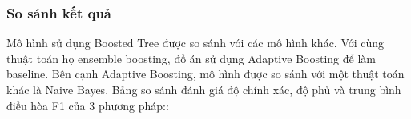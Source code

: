 \subsubsection*{So sánh kết quả}
Mô hình sử dụng Boosted Tree được so sánh với các mô hình khác. Với cùng thuật toán họ ensemble boosting, đồ án sử dụng Adaptive Boosting \cite{ada} để làm baseline. Bên cạnh Adaptive Boosting, mô hình được so sánh với một thuật toán khác là Naive Bayes\cite{naivebayes}. Bảng so sánh đánh giá độ chính xác, độ phủ và trung bình điều hòa F1 của 3 phương pháp::



